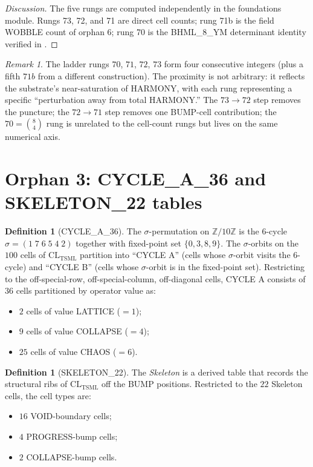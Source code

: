 \documentclass[11pt,reqno]{amsart}
\theoremstyle{plain}
\theoremstyle{definition}
\newtheorem{definition}[theorem]{Definition}
\theoremstyle{remark}
\newtheorem*{remark}{Remark}
\newcommand{\Z}{\mathbb{Z}}
\newcommand{\TSML}{\mathrm{TSML}}
\begin{document}
\begin{proof}[Discussion]
The five rungs are computed independently in the foundations
module. Rungs 73, 72, and 71 are direct cell counts; rung 71b is
the field WOBBLE count of orphan 6; rung 70 is the BHML\_8\_YM
determinant identity verified in \cite{SandersGishFpBHMLExtension}.
\end{proof}

\begin{remark}
The ladder rungs $70$, $71$, $72$, $73$ form four consecutive integers
(plus a fifth $71b$ from a different construction). The proximity is
not arbitrary: it reflects the substrate's near-saturation of HARMONY,
with each rung representing a specific
``perturbation away from total HARMONY.'' The
$73 \to 72$ step removes the puncture; the $72 \to 71$ step removes
one BUMP-cell contribution; the $70 = \binom{8}{4}$ rung is unrelated
to the cell-count rungs but lives on the same numerical axis.
\end{remark}

\section{Orphan 3: CYCLE\_A\_36 and SKELETON\_22 tables}
\label{sec:cycle-skeleton}

\begin{definition}[CYCLE\_A\_36]\label{def:cyclea36}
The $\sigma$-permutation on $\Z/10\Z$ is the $6$-cycle
$\sigma = (1\;7\;6\;5\;4\;2)$ together with fixed-point set $\{0, 3, 8, 9\}$.
The $\sigma$-orbits on the $100$ cells of $\mathrm{CL}_\TSML$ partition
into ``CYCLE A'' (cells whose $\sigma$-orbit visits the $6$-cycle)
and ``CYCLE B'' (cells whose $\sigma$-orbit is in the fixed-point set).
Restricting to the off-special-row, off-special-column,
off-diagonal cells, CYCLE A consists of $36$ cells partitioned by
operator value as:
\begin{itemize}
\item $2$ cells of value LATTICE ($=1$);
\item $9$ cells of value COLLAPSE ($=4$);
\item $25$ cells of value CHAOS ($=6$).
\end{itemize}
\end{definition}

\begin{definition}[SKELETON\_22]\label{def:skeleton22}
The \emph{Skeleton} is a derived table that records the structural
ribs of $\mathrm{CL}_\TSML$ off the BUMP positions. Restricted to the
$22$ Skeleton cells, the cell types are:
\begin{itemize}
\item $16$ VOID-boundary cells;
\item $4$ PROGRESS-bump cells;
\item $2$ COLLAPSE-bump cells.
\end{itemize}
\end{definition}
\end{document}
